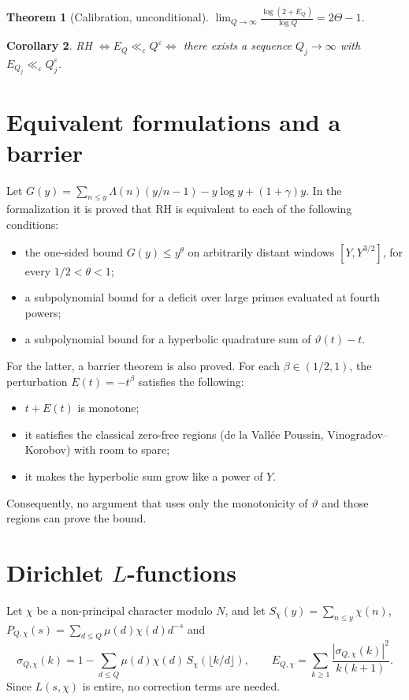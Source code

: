 \documentclass[11pt,a4paper]{amsart}
\newtheorem{theorem}{Theorem}
\newtheorem{corollary}[theorem]{Corollary}
\theoremstyle{definition}
\theoremstyle{remark}
\begin{document}
\begin{theorem}[Calibration, unconditional]\label{teo:calibracion}
$\displaystyle\lim_{Q\to\infty}\frac{\log(2+E_Q)}{\log Q}=2\Theta-1$.
\end{theorem}

\begin{corollary}
RH $\iff E_Q\ll_\varepsilon Q^\varepsilon\iff$ there exists a sequence $Q_j\to\infty$ with $E_{Q_j}\ll_\varepsilon Q_j^\varepsilon$.
\end{corollary}

\section{Equivalent formulations and a barrier}\label{sec:equiv}

Let $G(y)=\sum_{n\le y}\Lambda(n)(y/n-1)-y\log y+(1+\gamma)y$. In the formalization it is proved that RH is equivalent to each of the following conditions:
\begin{itemize}
\item the one-sided bound $G(y)\le y^\theta$ on arbitrarily distant windows $[Y,Y^{3/2}]$, for every $1/2<\theta<1$;
\item a subpolynomial bound for a deficit over large primes evaluated at fourth powers;
\item a subpolynomial bound for a hyperbolic quadrature sum of $\vartheta(t)-t$.
\end{itemize}
For the latter, a barrier theorem is also proved. For each $\beta\in(1/2,1)$, the perturbation $E(t)=-t^\beta$ satisfies the following:
\begin{itemize}
\item $t+E(t)$ is monotone;
\item it satisfies the classical zero-free regions (de la Vall\'ee Poussin, Vinogradov--Korobov) with room to spare;
\item it makes the hyperbolic sum grow like a power of $Y$.
\end{itemize}
Consequently, no argument that uses only the monotonicity of $\vartheta$ and those regions can prove the bound.

\section{Dirichlet \texorpdfstring{$L$}{L}-functions}\label{sec:dirichlet}

Let $\chi$ be a non-principal character modulo $N$, and let $S_\chi(y)=\sum_{n\le y}\chi(n)$, $P_{Q,\chi}(s)=\sum_{d\le Q}\mu(d)\chi(d)d^{-s}$ and
\[
\sigma_{Q,\chi}(k)=1-\sum_{d\le Q}\mu(d)\chi(d)\,S_\chi(\lfloor k/d\rfloor),\qquad
E_{Q,\chi}=\sum_{k\ge1}\frac{|\sigma_{Q,\chi}(k)|^2}{k(k+1)}.
\]
Since $L(s,\chi)$ is entire, no correction terms are needed.
\end{document}
